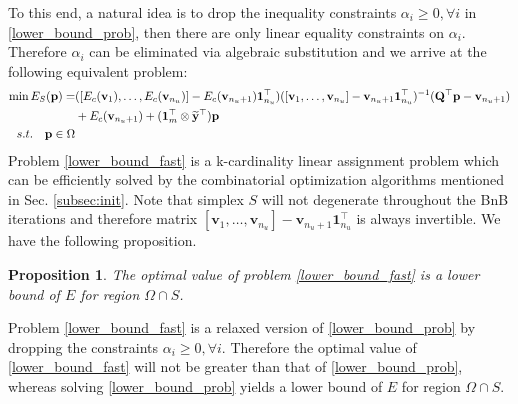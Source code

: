 \documentclass[11pt,bezier,]{article}
\newtheorem{proposition}{Proposition}
\begin{document}
To this end,
a natural idea is to drop the inequality constraints $\alpha_i\ge0,\forall i$ in \eqref{lower_bound_prob},
then there are only linear equality constraints on $\alpha_i$.
Therefore  $\alpha_i$ can be eliminated via algebraic substitution
 and we  arrive at the following equivalent problem:
\begin{align}
\min  E_S (\mathbf p) =&( [ E_c(\mathbf v_1),\ldots,E_c(\mathbf v_{n_u})]
- E_c(\mathbf v_{n_u+1}) \mathbf 1_{n_u}^\top) %
( [\mathbf v_1,\ldots,\mathbf v_{n_u}] -\mathbf v_{n_u+1} \mathbf 1_{n_u}^\top)^{-1}   %
 (\mathbf Q^\top\mathbf  p-\mathbf v_{n_u+1}) \notag\\
& + E_c(\mathbf v_{n_u+1})  +(\mathbf 1_m^\top\otimes\mathbf {\widetilde y}^\top)\mathbf  p \notag\\
s.t. \quad  \mathbf   p\in \Omega \label{lower_bound_fast} & %
\end{align}
Problem \eqref{lower_bound_fast} is a k-cardinality linear assignment problem
which can be efficiently solved by the combinatorial optimization algorithms
mentioned in Sec. \ref{subsec:init}.
Note that simplex $S$ will not degenerate throughout the BnB iterations
and therefore matrix 
$[\mathbf v_1,\ldots,\mathbf v_{n_u}] -\mathbf v_{n_u+1} \mathbf 1_{n_u}^\top$ is always invertible.
We have the following proposition.
\begin{proposition}
The optimal value of problem \eqref{lower_bound_fast} is a lower bound of $E$ for region $\Omega\cap S$.
\end{proposition}
{\proof
Problem \eqref{lower_bound_fast} is a relaxed version  of \eqref{lower_bound_prob} 
by dropping the constraints $\alpha_i\ge 0,\forall i$.
Therefore  the optimal  value of \eqref{lower_bound_fast} will not be greater than that of \eqref{lower_bound_prob},
whereas  solving \eqref{lower_bound_prob} yields a lower bound of $E$ for region $\Omega\cap S$.
}
\end{document}
